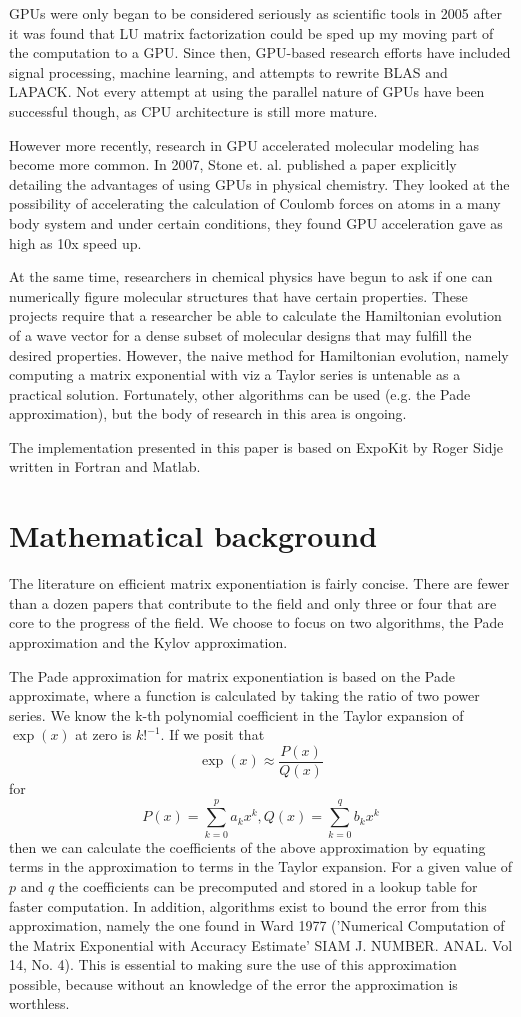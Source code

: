\documentclass[%
 reprint,
 amsmath,amssymb,
 aps,
]{revtex4-1}
\begin{document}
GPUs were only began to be considered seriously as scientific tools in 2005 after it was found that LU matrix factorization could be sped up my moving part of the computation to a GPU. Since then, GPU-based research efforts have included signal processing, machine learning, and attempts to rewrite BLAS and LAPACK. Not every attempt at using the parallel nature of GPUs have been successful though, as CPU architecture is still more mature. %

However more recently, research in GPU accelerated molecular modeling has become more common. In 2007, Stone et. al. published a paper explicitly detailing the advantages of using GPUs in physical chemistry. They looked at the possibility of accelerating the calculation of Coulomb forces on atoms in a many body system and under certain conditions, they found GPU acceleration gave as high as 10x speed up. %

At the same time, researchers in chemical physics have begun to ask if one can numerically figure molecular structures that have certain properties. These projects require that a researcher be able to calculate the Hamiltonian evolution of a wave vector for a dense subset of molecular designs that may fulfill the desired properties. However, the naive method for Hamiltonian evolution, namely computing a matrix exponential with viz a Taylor series is untenable as a practical solution. Fortunately, other algorithms can be used (e.g. the Pade approximation), but the body of research in this area is ongoing. %

The implementation presented in this paper is based on ExpoKit by Roger Sidje written in Fortran and Matlab. %

\section{Mathematical background}

The literature on efficient matrix exponentiation is fairly concise. There are fewer than a dozen papers that contribute to the field and only three or four that are core to the progress of the field. We choose to focus on two algorithms, the Pade approximation and the Kylov approximation. %

The Pade approximation for matrix exponentiation is based on the Pade approximate, where a function is calculated by taking the ratio of two power series. We know the k-th polynomial coefficient in the Taylor expansion of $\exp(x)$ at zero is $k!^{-1}$. If we posit that
$$ \exp(x)\approx\frac{P(x)}{Q(x)} $$
for
$$ P(x)=\sum_{k=0}^p a_kx^k, Q(x)=\sum_{k=0}^q b_kx^k $$
then we can calculate the coefficients of the above approximation by equating terms in the approximation to terms in the Taylor expansion. For a given value of $p$ and $q$ the coefficients can be precomputed and stored in a lookup table for faster computation. In addition, algorithms exist to bound the error from this approximation, namely the one found in Ward 1977 ('Numerical Computation of the Matrix Exponential with Accuracy Estimate' SIAM J. NUMBER. ANAL. Vol 14, No. 4). This is essential to making sure the use of this approximation possible, because without an knowledge of the error the approximation is worthless. %
\end{document}
